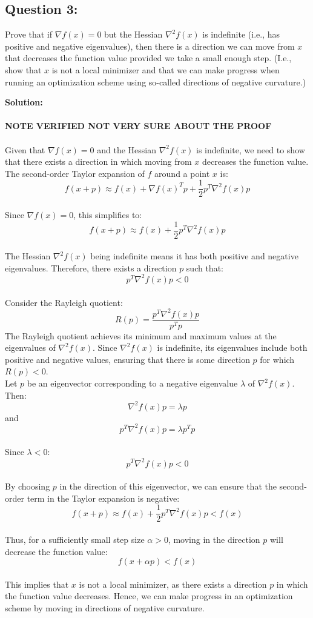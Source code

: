 \documentclass[11pt,onecolumn]{article}
\begin{document}
\subsection*{Question 3:}
Prove that if $\nabla f(x) = 0$ but the Hessian $\nabla^2f(x)$ is indefinite (i.e., has positive and negative eigenvalues), then there is a direction we can move from $x$ that decreases the function value provided we take a small enough step. (I.e., show that $x$ is not a local minimizer and that we can make progress when running an optimization scheme using so-called directions of negative curvature.)

\vspace*{12pt}

\noindent
\textbf{Solution:}
\\
\\
\textbf{NOTE VERIFIED NOT VERY SURE ABOUT THE PROOF}
\\
\\
Given that \(\nabla f(x) = 0\) and the Hessian \(\nabla^2 f(x)\) is indefinite, we need to show that there exists a direction in which moving from \(x\) decreases the function value.
\\
The second-order Taylor expansion of \(f\) around a point \(x\) is:
\[
f(x + p) \approx f(x) + \nabla f(x)^T p + \frac{1}{2} p^T \nabla^2 f(x) p
\]
\\
Since \(\nabla f(x) = 0\), this simplifies to:
\[
f(x + p) \approx f(x) + \frac{1}{2} p^T \nabla^2 f(x) p
\]
\\
The Hessian \(\nabla^2 f(x)\) being indefinite means it has both positive and negative eigenvalues. Therefore, there exists a direction \(p\) such that:
\[
p^T \nabla^2 f(x) p < 0
\]
\\
Consider the Rayleigh quotient:
\[
R(p) = \frac{p^T \nabla^2 f(x) p}{p^T p}
\]
The Rayleigh quotient achieves its minimum and maximum values at the eigenvalues of \(\nabla^2 f(x)\). Since \(\nabla^2 f(x)\) is indefinite, its eigenvalues include both positive and negative values, ensuring that there is some direction \(p\) for which \(R(p) < 0\).
\\
Let \(p\) be an eigenvector corresponding to a negative eigenvalue \(\lambda\) of \(\nabla^2 f(x)\). Then:
\[
\nabla^2 f(x) p = \lambda p
\]
and
\[
p^T \nabla^2 f(x) p = \lambda p^T p
\]
\\
Since \(\lambda < 0\):
\[
p^T \nabla^2 f(x) p < 0
\]
\\
By choosing \(p\) in the direction of this eigenvector, we can ensure that the second-order term in the Taylor expansion is negative:
\[
f(x + p) \approx f(x) + \frac{1}{2} p^T \nabla^2 f(x) p < f(x)
\]
\\
Thus, for a sufficiently small step size \(\alpha > 0\), moving in the direction \(p\) will decrease the function value:
\[
f(x + \alpha p) < f(x)
\]
\\
This implies that \(x\) is not a local minimizer, as there exists a direction \(p\) in which the function value decreases. Hence, we can make progress in an optimization scheme by moving in directions of negative curvature.
\end{document}
